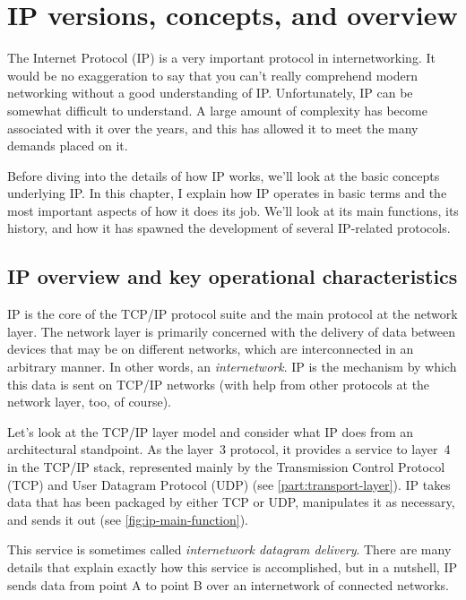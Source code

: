 \chapter{IP versions, concepts, and overview}


The Internet Protocol (IP) is a very important protocol in
internetworking. It would be no exaggeration to say that you can't
really comprehend modern networking without a good understanding of IP.
Unfortunately, IP can be somewhat difficult to understand. A large
amount of complexity has become associated with it over the years, and
this has allowed it to meet the many demands placed on it.

Before diving into the details of how IP works, we'll look at the basic
concepts underlying IP. In this chapter, I explain how IP operates in
basic terms and the most important aspects of how it does its job. We'll
look at its main functions, its history, and how it has spawned the
development of several IP-related protocols.



\section{IP overview and key operational characteristics}

IP is the core of the TCP/IP protocol suite and the main protocol at the network layer.
The network layer is primarily concerned with the delivery of data between devices that may be on different networks, which are
interconnected in an arbitrary manner.
In other words, an {\emph{internetwork}}.
IP is the mechanism by which this data is sent on TCP/IP networks (with help from other protocols at the network layer, too, of course).

Let's look at the TCP/IP layer model and consider what IP does from an
architectural standpoint. As the layer~3 protocol, it provides a service
to layer~4 in the TCP/IP stack, represented mainly by the Transmission
Control Protocol (TCP) and User Datagram Protocol (UDP) (see \vref{part:transport-layer}).
IP takes data that has been packaged by either TCP or UDP, manipulates it as necessary, and sends it out (see \cref{fig:ip-main-function}).

This service is sometimes called {\emph{internetwork datagram delivery}}.
There are many details that explain exactly how this service is accomplished, but in a nutshell, IP sends data from point A to point B over an internetwork of connected networks.


